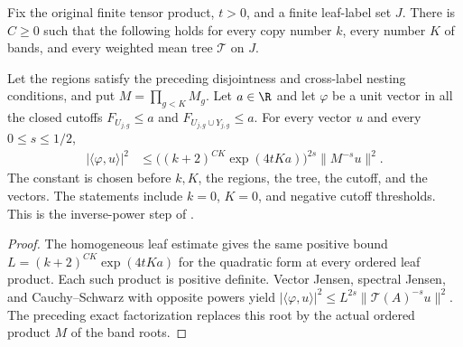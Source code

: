\begin{theorem}

    \label{thm:replica_pinned_tree_inverse_overlap}
    \leanok
    Fix the original finite tensor product, $t>0$, and a finite leaf-label
    set $J$. There is $C\ge0$ such that the following holds for every copy
    number $k$, every number $K$ of bands, and every weighted mean tree
    $\mathcal T$ on $J$.

    Let the regions satisfy the preceding disjointness and cross-label
    nesting conditions, and put $M=\prod_{g<K}M_g$. Let $a\in\R$
    and let $\varphi$ be a unit vector in all the closed cutoffs
    $F_{U_{j,g}}\le a$ and $F_{U_{j,g}\cup Y_{j,g}}\le a$.
    For every vector $u$ and every $0\le s\le1/2$,
    \begin{align*}
        |\langle\varphi,u\rangle|^2
        &\le
        \bigl((k+2)^{CK}\exp(4tKa)\bigr)^{2s}
        \|M^{-s}u\|^2.
    \end{align*}
    The constant is chosen before $k,K$, the regions, the tree, the
    cutoff, and the vectors. The statements include $k=0$, $K=0$,
    and negative cutoff thresholds. This is the inverse-power step of
    \cite[\texttt{07-comparators.tex}, lines 367--381]{OpenAI2026AreaLaw}.
\end{theorem}
\begin{proof}
    \leanok

    The homogeneous leaf estimate gives the same positive bound
    $L=(k+2)^{CK}\exp(4tKa)$ for the quadratic form at every ordered
    leaf product. Each such product is positive definite. Vector Jensen,
    spectral Jensen, and Cauchy--Schwarz with opposite powers yield
    $|\langle\varphi,u\rangle|^2\le L^{2s}\|\mathcal T(A)^{-s}u\|^2$.
    The preceding exact factorization replaces this root by the actual
    ordered product $M$ of the band roots.
\end{proof}
